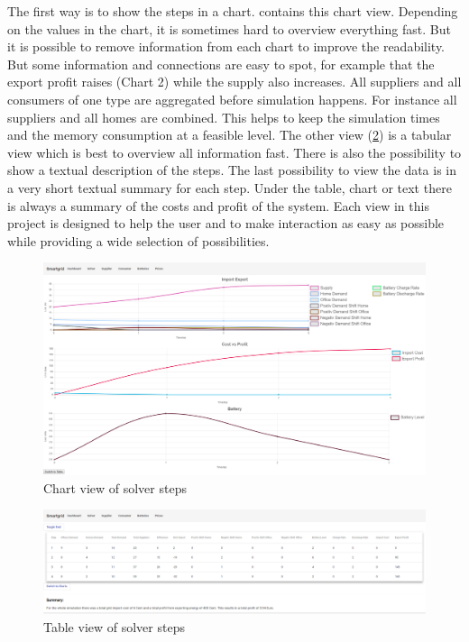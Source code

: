 The first way is to show the steps in a chart.  contains this chart view. Depending on the values in the chart, it is sometimes hard to overview everything fast. But it is possible to remove information from each chart to improve the readability. But some information and connections are easy to spot, for example that the export profit raises (Chart 2) while the supply also increases. All suppliers and all consumers of one type are aggregated before simulation happens. For instance all suppliers and all homes are combined. This helps to keep the simulation times and the memory consumption at a feasible level. The other view (\cref{fig:solverTable}) is a tabular view which is best to overview all information fast.
There is also the possibility to show a textual description of the steps. The last possibility to view the data is in a very short textual summary for each step.
Under the table, chart or text there is always a summary of the costs and profit of the system.
Each view in this project is designed to help the user and to make interaction as easy as possible while providing a wide selection of possibilities.
\begin{figure}[!h]
	\centering
	\includegraphics[width=1.00\textwidth]{../figures/SolverChartsCut.png}
	\caption{Chart view of solver steps}
	\label{fig:solverChats}
\end{figure}

\begin{figure}[!h]
    \centering
\includegraphics[width=1.00\textwidth]{../figures/SolverTableCut.png}
    \caption{Table view of solver steps}
    \label{fig:solverTable}
\end{figure}